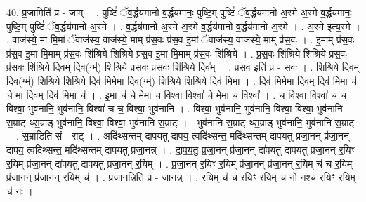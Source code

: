 \documentclass[17pt]{extarticle}
\begin{document}
40. प्र॒जामिति॑ प्र - जाम् । . पुष्टिं॑ ॅव॒र्द्धय॑मानो व॒र्द्धय॑मानः॒ पुष्टि॒म् पुष्टिं॑ ॅव॒र्द्धय॑मानो अ॒स्मे अ॒स्मे व॒र्द्धय॑मानः॒ पुष्टि॒म् पुष्टिं॑ ॅव॒र्द्धय॑मानो अ॒स्मे । . व॒र्द्धय॑मानो अ॒स्मे अ॒स्मे व॒र्द्धय॑मानो व॒र्द्धय॑मानो अ॒स्मे । . अ॒स्मे इत्य॒स्मे । . वाज॑स्ये॒ मा मि॒मां ॅवाज॑स्य॒ वाज॑स्ये॒ माम् प्र॑स॒वः प्र॑स॒व इ॒मां ॅवाज॑स्य॒ वाज॑स्ये॒ माम् प्र॑स॒वः । . इ॒माम् प्र॑स॒वः प्र॑स॒व इ॒मा मि॒माम् प्र॑स॒वः शि॑श्रिये शिश्रिये प्रस॒व इ॒मा मि॒माम् प्र॑स॒वः शि॑श्रिये । . प्र॒स॒वः शि॑श्रिये शिश्रिये प्रस॒वः प्र॑स॒वः शि॑श्रिये॒ दिव॒म् दिव(ग्म्॑) शिश्रिये प्रस॒वः प्र॑स॒वः शि॑श्रिये॒ दिव᳚म् । . प्र॒स॒व इति॑ प्र - स॒वः । . शि॒श्रि॒ये॒ दिव॒म् दिव(ग्म्॑) शिश्रिये शिश्रिये॒ दिव॑ मि॒मेमा दिव(ग्म्॑) शिश्रिये शिश्रिये॒ दिव॑ मि॒मा । . दिव॑ मि॒मेमा दिव॒म् दिव॑ मि॒मा च॑ चे॒ मा दिव॒म् दिव॑ मि॒मा च॑ । . इ॒मा च॑ चे॒ मेमा च॒ विश्वा॒ विश्वा॑ चे॒ मेमा च॒ विश्वा᳚ । . च॒ विश्वा॒ विश्वा॑ च च॒ विश्वा॒ भुव॑नानि॒ भुव॑नानि॒ विश्वा॑ च च॒ विश्वा॒ भुव॑नानि । . विश्वा॒ भुव॑नानि॒ भुव॑नानि॒ विश्वा॒ विश्वा॒ भुव॑नानि स॒म्राट् थ्स॒म्राड् भुव॑नानि॒ विश्वा॒ विश्वा॒ भुव॑नानि स॒म्राट् । . भुव॑नानि स॒म्राट् थ्स॒म्राड् भुव॑नानि॒ भुव॑नानि स॒म्राट् । . स॒म्राडिति॑ सं - राट् । . अदि॑थ्सन्तम् दापयतु दापय॒ त्वदि॑थ्सन्त॒ मदि॑थ्सन्तम् दापयतु प्रजा॒नन् प्र॑जा॒नन् दा॑पय॒ त्वदि॑थ्सन्त॒ मदि॑थ्सन्तम् दापयतु प्रजा॒नन्न् । . दा॒प॒य॒तु॒ प्र॒जा॒नन् प्र॑जा॒नन् दा॑पयतु दापयतु प्रजा॒नन् र॒यिꣳ र॒यिम् प्र॑जा॒नन् दा॑पयतु दापयतु प्रजा॒नन् र॒यिम् । . प्र॒जा॒नन् र॒यिꣳ र॒यिम् प्र॑जा॒नन् प्र॑जा॒नन् र॒यिम् च॑ च र॒यिम् प्र॑जा॒नन् प्र॑जा॒नन् र॒यिम् च॑ । . प्र॒जा॒नन्निति॑ प्र - जा॒नन्न् । . र॒यिम् च॑ च र॒यिꣳ र॒यिम् च॑ नो नश्च र॒यिꣳ र॒यिम् च॑ नः । \newline
\pagebreak
{}
\end{document}
